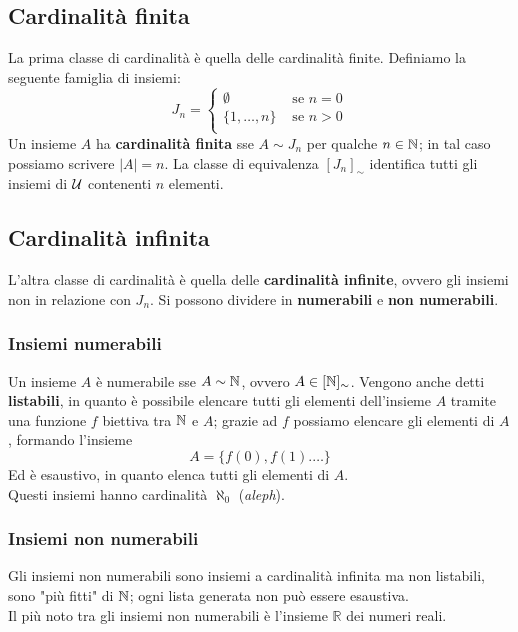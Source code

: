 \subsection{Cardinalità finita}
La prima classe di cardinalità è quella delle cardinalità finite. Definiamo la seguente famiglia di insiemi:
$$ J_n = \begin{cases}
	\emptyset & \text{ se } n = 0 \\
	\{1, \dots , n\} & \text{ se } n > 0 \\
\end{cases}$$
Un insieme $A$ ha \textbf{cardinalità finita} sse $A \sim J_n$ per qualche $n \in \mathbb{N}$; in tal caso possiamo scrivere $|A| = n$. La classe di equivalenza $[J_n]_{\sim}$ identifica tutti gli insiemi di $\mathcal{U}$ contenenti $n$ elementi.\\

\subsection{Cardinalità infinita}
L'altra classe di cardinalità è quella delle \textbf{cardinalità infinite}, ovvero gli insiemi non in relazione con $J_n$. Si possono dividere in \textbf{numerabili} e \textbf{non numerabili}.

\subsubsection{Insiemi numerabili}
Un insieme $A$ è numerabile sse $A \sim \mathbb{N}$, ovvero $A \in [\mathbb{N}]_\sim$. Vengono anche detti \textbf{listabili}, in quanto è possibile elencare tutti gli elementi dell'insieme $A$ tramite una funzione $f$ biettiva tra $\mathbb{N}$ e $A$; grazie ad $f$ possiamo elencare gli elementi di $A$, formando l'insieme 
$$ A = \{f(0), f(1). \dots \} $$
Ed è esaustivo, in quanto elenca tutti gli elementi di $A$.\\

Questi insiemi hanno cardinalità $\aleph_0$ (\textit{aleph}).\\

\subsubsection{Insiemi non numerabili}
Gli insiemi non numerabili sono insiemi a cardinalità infinita ma non listabili, sono "più fitti" di $\mathbb{N}$; ogni lista generata non può essere esaustiva.\\

Il più noto tra gli insiemi non numerabili è l'insieme $\mathbb{R}$ dei numeri reali.\\

